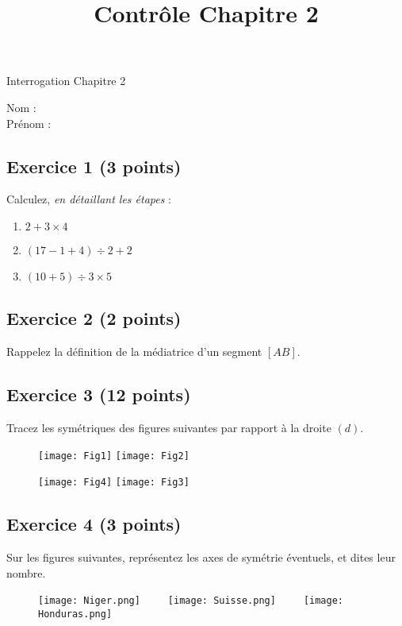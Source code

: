 \documentclass[14 pt]{extarticle}
\title{Contrôle Chapitre 2}
\date{}
\theoremstyle{plain}
\begin{document}
\begin{center}{\Large Interrogation Chapitre 2}\\ 
 \end{center}
 Nom : \\
 Prénom : \\
 \subsection*{Exercice 1 (3 points)}
 Calculez, \emph{en détaillant les étapes} : 
 \begin{enumerate}
 \item $2 + 3 \times 4$
 \item $(17 -1 + 4) \div 2 +2 $
 \item $ (10 + 5)\div 3 \times 5$
 \end{enumerate}
 \subsection*{Exercice 2 (2 points)}
 
 Rappelez la définition de la médiatrice d'un segment $[AB]$. 
 
 \subsection*{Exercice 3 (12 points)}
 
 Tracez les symétriques des figures suivantes par rapport à la droite $(d)$.
 
 \begin{figure}[H]
 \center
 \texttt{[image: Fig1]}
 \texttt{[image: Fig2]}
 \end{figure}
 \newpage
  \begin{figure}[H]
 \center
 \texttt{[image: Fig4]}
 \texttt{[image: Fig3]}
 \end{figure}
 
\subsection*{Exercice 4 (3 points)} 

Sur les figures suivantes, représentez les axes de symétrie éventuels, et dites leur nombre.  

\begin{figure}[H]
\center 
\texttt{[image: Niger.png]}\ \ \ \ \ 
\texttt{[image: Suisse.png]}\ \ \ \ \ 
\texttt{[image: Honduras.png]}
\end{figure}
 
\end{document}
